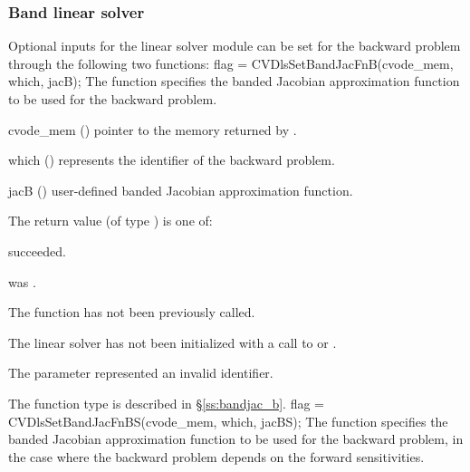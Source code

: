 \subsubsection{Band linear solver}
Optional inputs for the {\cvband} linear solver module can be set for the backward
problem through the following two functions:
{
  flag = CVDlsSetBandJacFnB(cvode\_mem, which, jacB);
}
{
  The function  specifies the banded Jacobian
  approximation function to be used for the backward problem.
}
{
  \begin{args}
  \item[cvode\_mem] ()
    pointer to the {\cvodes} memory returned by .
  \item[which] ()
    represents the identifier of the backward problem.
  \item[jacB] ()
    user-defined banded Jacobian approximation function.
  \end{args}
}
{
  The return value  (of type ) is one of:
  \begin{args}
  \item[\Id{CVDLS\_SUCCESS}] 
     succeeded.
  \item[\Id{CVDLS\_MEM\_NULL}]
     was .
  \item[\Id{CVDLS\_NO\_ADJ}]
    The function  has not been previously called.
  \item[\Id{CVDLS\_LMEM\_NULL}]
    The linear solver has not been initialized with a call to 
    or .
  \item[\Id{CVDLS\_ILL\_INPUT}]
    The parameter  represented an invalid identifier.
  \end{args}
}
{
  The function type  is described in \S\ref{ss:bandjac_b}.
}
{
  flag = CVDlsSetBandJacFnBS(cvode\_mem, which, jacBS);
}
{
  The function  specifies the banded Jacobian
  approximation function to be used for the backward problem, in the
  case where the backward problem depends on the forward sensitivities.
}
